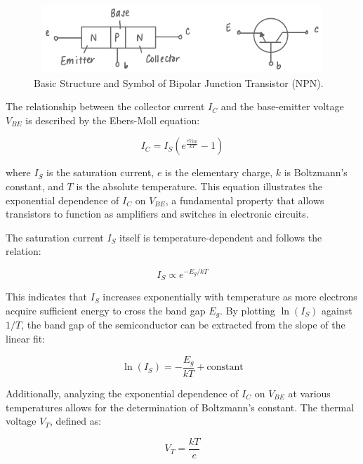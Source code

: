 \documentclass[12pt,letterpaper,twocolumn]{article}
\begin{document}
\begin{figure}[H]
\centerline{\includegraphics[width=4.8in, height=1in]{NPN BJT.jpg}}
\caption{Basic Structure and Symbol of Bipolar Junction Transistor (NPN).}
\label{fig}
\end{figure}

The relationship between the collector current \( I_C \) and the base-emitter voltage \( V_{BE} \) is described by the Ebers-Moll equation:

\begin{equation}
I_C = I_S \left(e^{\frac{eV_{BE}}{kT}} - 1\right)
\end{equation}

where \( I_S \) is the saturation current, \( e \) is the elementary charge, \( k \) is Boltzmann’s constant, and \( T \) is the absolute temperature. This equation illustrates the exponential dependence of \( I_C \) on \( V_{BE} \), a fundamental property that allows transistors to function as amplifiers and switches in electronic circuits\cite{Neudeck}.

The saturation current \( I_S \) itself is temperature-dependent and follows the relation:

\begin{equation}
I_S \propto e^{-E_g/kT}
\end{equation}

This indicates that \( I_S \) increases exponentially with temperature as more electrons acquire sufficient energy to cross the band gap \( E_g \). By plotting \( \ln(I_S) \) against \( 1/T \), the band gap of the semiconductor can be extracted from the slope of the linear fit:

\begin{equation}
\ln(I_S) = -\frac{E_g}{kT} + \text{constant}
\end{equation}

Additionally, analyzing the exponential dependence of \( I_C \) on \( V_{BE} \) at various temperatures allows for the determination of Boltzmann’s constant. The thermal voltage \( V_T \), defined as:

\begin{equation}
V_T = \frac{kT}{e}
\end{equation}
\end{document}
